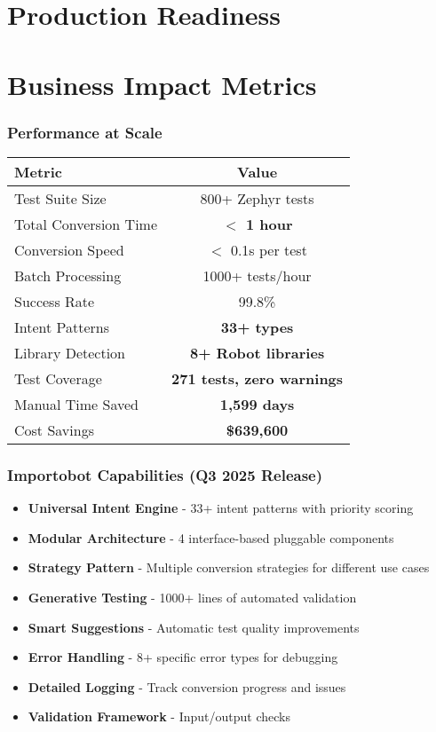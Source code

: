\section{Production Readiness}

\section{Business Impact Metrics}
\begin{frame}
\frametitle{Performance at Scale}
\begin{center}
\begin{tabular}{|l|c|}
\hline
\textbf{Metric} & \textbf{Value} \\
\hline
Test Suite Size & 800+ Zephyr tests \\
\hline
Total Conversion Time & \textbf{$<$ 1 hour} \\
\hline
Conversion Speed & $<$ 0.1s per test \\
\hline
Batch Processing & 1000+ tests/hour \\
\hline
Success Rate & 99.8\% \\
\hline
Intent Patterns & \textbf{33+ types} \\
\hline
Library Detection & \textbf{8+ Robot libraries} \\
\hline
Test Coverage & \textbf{271 tests, zero warnings} \\
\hline
Manual Time Saved & \textbf{1,599 days} \\
\hline
Cost Savings & \textbf{\$639,600} \\
\hline
\end{tabular}

\end{center}
\end{frame}

\begin{frame}
\frametitle{Importobot Capabilities (Q3 2025 Release)}
\begin{itemize}
    \item \textbf{Universal Intent Engine} - 33+ intent patterns with priority scoring
    \item \textbf{Modular Architecture} - 4 interface-based pluggable components
    \item \textbf{Strategy Pattern} - Multiple conversion strategies for different use cases
    \item \textbf{Generative Testing} - 1000+ lines of automated validation
    \item \textbf{Smart Suggestions} - Automatic test quality improvements
    \item \textbf{Error Handling} - 8+ specific error types for debugging
    \item \textbf{Detailed Logging} - Track conversion progress and issues
    \item \textbf{Validation Framework} - Input/output checks
\end{itemize}
\end{frame}